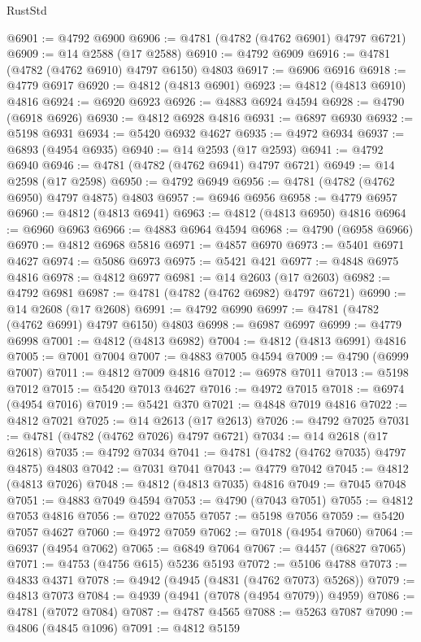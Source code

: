 \begin{lexlean}{RustStd}
\begin{coremodule}
@6901 := @4792 @6900
@6906 := @4781 (@4782 (@4762 @6901) @4797 @6721)
@6909 := @14 @2588 (@17 @2588)
@6910 := @4792 @6909
@6916 := @4781 (@4782 (@4762 @6910) @4797 @6150) @4803
@6917 := @6906 @6916
@6918 := @4779 @6917
@6920 := @4812 (@4813 @6901)
@6923 := @4812 (@4813 @6910) @4816
@6924 := @6920 @6923
@6926 := @4883 @6924 @4594
@6928 := @4790 (@6918 @6926)
@6930 := @4812 @6928 @4816
@6931 := @6897 @6930
@6932 := @5198 @6931
@6934 := @5420 @6932 @4627
@6935 := @4972 @6934
@6937 := @6893 (@4954 @6935)
@6940 := @14 @2593 (@17 @2593)
@6941 := @4792 @6940
@6946 := @4781 (@4782 (@4762 @6941) @4797 @6721)
@6949 := @14 @2598 (@17 @2598)
@6950 := @4792 @6949
@6956 := @4781 (@4782 (@4762 @6950) @4797 @4875) @4803
@6957 := @6946 @6956
@6958 := @4779 @6957
@6960 := @4812 (@4813 @6941)
@6963 := @4812 (@4813 @6950) @4816
@6964 := @6960 @6963
@6966 := @4883 @6964 @4594
@6968 := @4790 (@6958 @6966)
@6970 := @4812 @6968 @5816
@6971 := @4857 @6970
@6973 := @5401 @6971 @4627
@6974 := @5086 @6973
@6975 := @5421 @421
@6977 := @4848 @6975 @4816
@6978 := @4812 @6977
@6981 := @14 @2603 (@17 @2603)
@6982 := @4792 @6981
@6987 := @4781 (@4782 (@4762 @6982) @4797 @6721)
@6990 := @14 @2608 (@17 @2608)
@6991 := @4792 @6990
@6997 := @4781 (@4782 (@4762 @6991) @4797 @6150) @4803
@6998 := @6987 @6997
@6999 := @4779 @6998
@7001 := @4812 (@4813 @6982)
@7004 := @4812 (@4813 @6991) @4816
@7005 := @7001 @7004
@7007 := @4883 @7005 @4594
@7009 := @4790 (@6999 @7007)
@7011 := @4812 @7009 @4816
@7012 := @6978 @7011
@7013 := @5198 @7012
@7015 := @5420 @7013 @4627
@7016 := @4972 @7015
@7018 := @6974 (@4954 @7016)
@7019 := @5421 @370
@7021 := @4848 @7019 @4816
@7022 := @4812 @7021
@7025 := @14 @2613 (@17 @2613)
@7026 := @4792 @7025
@7031 := @4781 (@4782 (@4762 @7026) @4797 @6721)
@7034 := @14 @2618 (@17 @2618)
@7035 := @4792 @7034
@7041 := @4781 (@4782 (@4762 @7035) @4797 @4875) @4803
@7042 := @7031 @7041
@7043 := @4779 @7042
@7045 := @4812 (@4813 @7026)
@7048 := @4812 (@4813 @7035) @4816
@7049 := @7045 @7048
@7051 := @4883 @7049 @4594
@7053 := @4790 (@7043 @7051)
@7055 := @4812 @7053 @4816
@7056 := @7022 @7055
@7057 := @5198 @7056
@7059 := @5420 @7057 @4627
@7060 := @4972 @7059
@7062 := @7018 (@4954 @7060)
@7064 := @6937 (@4954 @7062)
@7065 := @6849 @7064
@7067 := @4457 (@6827 @7065)
@7071 := @4753 (@4756 @615) @5236 @5193
@7072 := @5106 @4788
@7073 := @4833 @4371
@7078 := @4942 (@4945 (@4831 (@4762 @7073) @5268))
@7079 := @4813 @7073
@7084 := @4939 (@4941 (@7078 (@4954 @7079)) @4959)
@7086 := @4781 (@7072 @7084)
@7087 := @4787 @4565
@7088 := @5263 @7087
@7090 := @4806 (@4845 @1096)
@7091 := @4812 @5159

\end{coremodule}
\end{lexlean}
